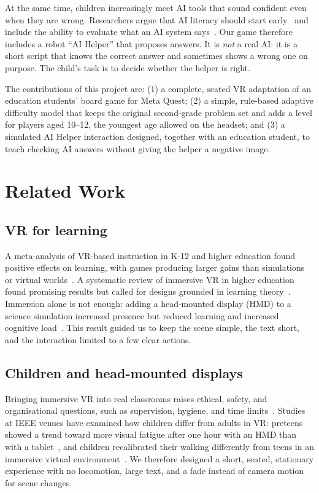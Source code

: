 \documentclass[conference]{IEEEtran}
\begin{document}
At the same time, children increasingly meet AI tools that sound confident even when they are wrong. Researchers argue that AI literacy should start early~\cite{touretzky2019} and include the ability to evaluate what an AI system says~\cite{long2020}. Our game therefore includes a robot ``AI Helper'' that proposes answers. It is \emph{not} a real AI: it is a short script that knows the correct answer and sometimes shows a wrong one on purpose. The child's task is to decide whether the helper is right.

The contributions of this project are: (1) a complete, seated VR adaptation of an education students' board game for Meta Quest; (2) a simple, rule-based adaptive difficulty model that keeps the original second-grade problem set and adds a level for players aged 10--12, the youngest age allowed on the headset; and (3) a simulated AI Helper interaction designed, together with an education student, to teach checking AI answers without giving the helper a negative image.

\section{Related Work}

\subsection{VR for learning}
A meta-analysis of VR-based instruction in K-12 and higher education found positive effects on learning, with games producing larger gains than simulations or virtual worlds~\cite{merchant2014}. A systematic review of immersive VR in higher education found promising results but called for designs grounded in learning theory~\cite{radianti2020}. Immersion alone is not enough: adding a head-mounted display (HMD) to a science simulation increased presence but reduced learning and increased cognitive load~\cite{makransky2019}. This result guided us to keep the scene simple, the text short, and the interaction limited to a few clear actions.

\subsection{Children and head-mounted displays}
Bringing immersive VR into real classrooms raises ethical, safety, and organisational questions, such as supervision, hygiene, and time limits~\cite{southgate2019}. Studies at IEEE venues have examined how children differ from adults in VR: preteens showed a trend toward more visual fatigue after one hour with an HMD than with a tablet~\cite{yu2018}, and children recalibrated their walking differently from teens in an immersive virtual environment~\cite{adams2018}. We therefore designed a short, seated, stationary experience with no locomotion, large text, and a fade instead of camera motion for scene changes.
\end{document}
